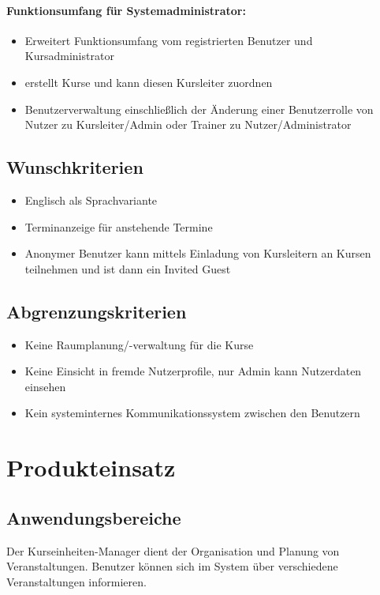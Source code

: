 \documentclass[a4paper]{scrreprt}
\begin{document}
		\subsubsection{Funktionsumfang für Systemadministrator:}
			\begin{itemize}
			\item Erweitert Funktionsumfang vom \glqq registrierten Benutzer\grqq{} und \glqq Kursadministrator\grqq
			\item erstellt Kurse und kann diesen Kursleiter zuordnen
			\item Benutzerverwaltung einschließlich der Änderung einer Benutzerrolle von Nutzer zu Kursleiter/\gls{Admin} oder \gls{Trainer} zu Nutzer/Administrator
			\end{itemize}
			
    \section{Wunschkriterien}
			\begin{itemize}
			\item Englisch als Sprachvariante
			\item Terminanzeige für anstehende Termine
       		\item Anonymer Benutzer kann mittels Einladung von Kursleitern an Kursen teilnehmen und ist dann ein \glqq Invited Guest\grqq{}
			\end{itemize}
		\section{Abgrenzungskriterien}
     		\begin{itemize}
     		\item Keine Raumplanung/-verwaltung für die Kurse
     		\item Keine Einsicht in fremde Nutzerprofile, nur Admin kann Nutzerdaten einsehen
     		\item Kein systeminternes Kommunikationssystem zwischen den Benutzern
     		\end{itemize}
        
  
\chapter{Produkteinsatz}
    \section{Anwendungsbereiche}
		 Der Kurseinheiten-Manager dient der Organisation und Planung von Veranstaltungen. Benutzer können sich im System über verschiedene Veranstaltungen informieren.   
     
\end{document}

